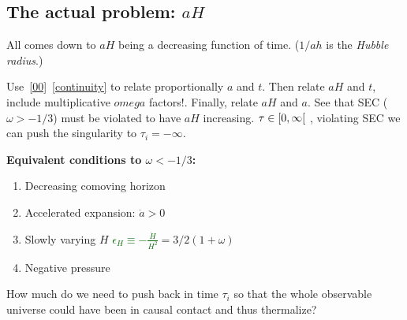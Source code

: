 \subsection{The actual problem: $aH$}
All comes down to $aH$ being a decreasing function of time. ($1/ah$ is the \textit{Hubble radius}.)

Use~\eqref{00}~\eqref{continuity} to relate proportionally $a$ and $t$. Then relate $aH$ and $t$, include multiplicative $omega$ factors!. Finally, relate  $aH$ and $a$. 
See that SEC ($\omega>-1/3$) must be violated to have $aH$ increasing. \textcolor{darkred}{$\tau \in \left[ 0, \infty \right[$} , violating SEC we can push the singularity to $\tau_i = -\infty$.

\begin{mycolorbox}
    \textbf{Equivalent conditions to $\omega<-1/3$:}

    \begin{enumerate}
        \item Decreasing comoving horizon
        \item Accelerated expansion: $\ddot{a} >0$
        \item Slowly varying $H$ \hfill \textcolor{darkgreen}{$\epsilon_H \equiv -\frac{\dot{H}}{H^2}$}\textcolor{mypurple}{$=3/2 (1+\omega)$}
        \item Negative pressure
    \end{enumerate}
\end{mycolorbox}    

How much do we need to push back in time $\tau_i$ so that the whole observable universe could have been in causal contact and thus thermalize?
    
    